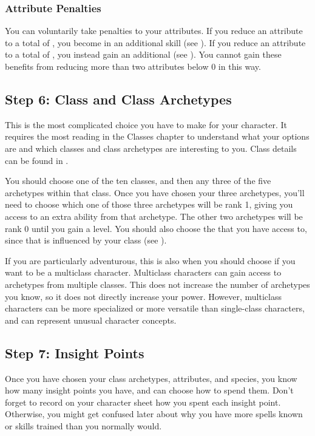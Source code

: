         \subsubsection{Attribute Penalties}\label{Attribute Penalties}
            You can voluntarily take penalties to your attributes.
            If you reduce an attribute to a total of , you become  in an additional skill (see ).
            If you reduce an attribute to a total of , you instead gain an additional  (see ).
            You cannot gain these benefits from reducing more than two attributes below 0 in this way.

    \subsection{Step 6: Class and Class Archetypes}
        This is the most complicated choice you have to make for your character.
        It requires the most reading in the Classes chapter to understand what your options are and which classes and class archetypes are interesting to you.
        Class details can be found in .

        You should choose one of the ten classes, and then any three of the five archetypes within that class.
        Once you have chosen your three archetypes, you'll need to choose which one of those three archetypes will be rank 1, giving you access to an extra ability from that archetype.
        The other two archetypes will be rank 0 until you gain a level.
        You should also choose the  that you have access to, since that is influenced by your class (see ).

        If you are particularly adventurous, this is also when you should choose if you want to be a multiclass character.
        Multiclass characters can gain access to archetypes from multiple classes.
        This does not increase the number of archetypes you know, so it does not directly increase your power.
        However, multiclass characters can be more specialized or more versatile than single-class characters, and can represent unusual character concepts.

    \subsection{Step 7: Insight Points}
        Once you have chosen your class archetypes, attributes, and species, you know how many insight points you have, and can choose how to spend them.
        Don't forget to record on your character sheet how you spent each insight point.
        Otherwise, you might get confused later about why you have more spells known or skills trained than you normally would.

